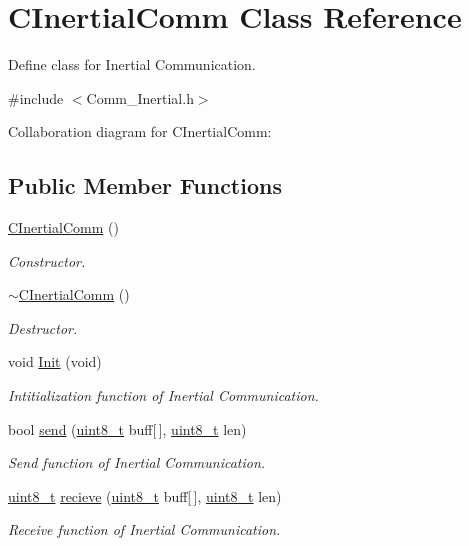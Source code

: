 \hypertarget{class_c_inertial_comm}{}\section{C\+Inertial\+Comm Class Reference}
\label{class_c_inertial_comm}


Define class for Inertial Communication.  




{\ttfamily \#include $<$Comm\+\_\+\+Inertial.\+h$>$}



Collaboration diagram for C\+Inertial\+Comm\+:
\subsection*{Public Member Functions}
\begin{DoxyCompactItemize}
\item 
\mbox{\hyperlink{class_c_inertial_comm_a86917a157b0acfa80c9f178f18d882fc}{C\+Inertial\+Comm}} ()
\begin{DoxyCompactList}\small\item\em Constructor. \end{DoxyCompactList}\item 
\mbox{\hyperlink{class_c_inertial_comm_a7673549eec2f597714a39b2c4f5ab3ae}{$\sim$\+C\+Inertial\+Comm}} ()
\begin{DoxyCompactList}\small\item\em Destructor. \end{DoxyCompactList}\item 
void \mbox{\hyperlink{class_c_inertial_comm_aa8c4c1dc4ca32817bb51c520c052b4c3}{Init}} (void)
\begin{DoxyCompactList}\small\item\em Intitialization function of Inertial Communication. \end{DoxyCompactList}\item 
bool \mbox{\hyperlink{class_c_inertial_comm_ad40aa8ed083373c27fdc1aa11dfc319e}{send}} (\mbox{\hyperlink{_a_d_a_s___types_8h_aba7bc1797add20fe3efdf37ced1182c5}{uint8\+\_\+t}} buff\mbox{[}$\,$\mbox{]}, \mbox{\hyperlink{_a_d_a_s___types_8h_aba7bc1797add20fe3efdf37ced1182c5}{uint8\+\_\+t}} len)
\begin{DoxyCompactList}\small\item\em Send function of Inertial Communication. \end{DoxyCompactList}\item 
\mbox{\hyperlink{_a_d_a_s___types_8h_aba7bc1797add20fe3efdf37ced1182c5}{uint8\+\_\+t}} \mbox{\hyperlink{class_c_inertial_comm_abaed54099a0192df5a9318dc99de3668}{recieve}} (\mbox{\hyperlink{_a_d_a_s___types_8h_aba7bc1797add20fe3efdf37ced1182c5}{uint8\+\_\+t}} buff\mbox{[}$\,$\mbox{]}, \mbox{\hyperlink{_a_d_a_s___types_8h_aba7bc1797add20fe3efdf37ced1182c5}{uint8\+\_\+t}} len)
\begin{DoxyCompactList}\small\item\em Receive function of Inertial Communication. \end{DoxyCompactList}\end{DoxyCompactItemize}


